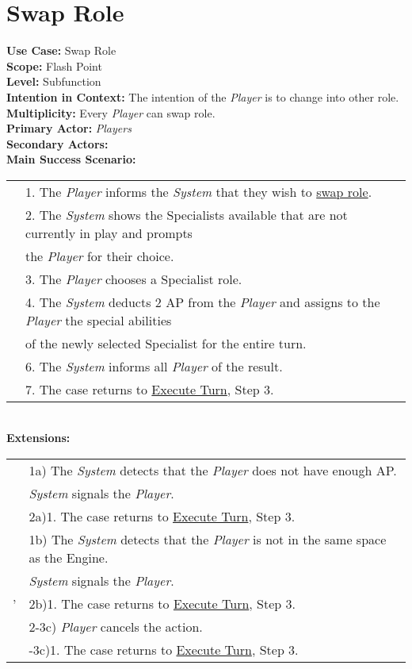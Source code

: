 \documentclass{article}
\begin{document}
	\section*{Swap Role}
	\textbf{Use Case:} Swap Role\\
	\textbf{Scope:} Flash Point\\
	\textbf{Level:} Subfunction\\
	\textbf{Intention in Context:} The intention of the \textit{Player} is to change into other role.\\
	\textbf{Multiplicity: }Every \textit{Player} can swap role.\\
	\textbf{Primary Actor:} \textit{Players}\\
	\textbf{Secondary Actors:}\\
	\textbf{Main Success Scenario:}\\
	\begin{tabular}{l l}
		&1. The \textit{Player} informs the \textit{System} that they wish to \underline{swap role}.\\
		&2. The \textit{System} shows the Specialists available that are not currently in play and prompts\\ &\qquad the \textit{Player} for their choice.\\
		&3. The \textit{Player} chooses a Specialist role.\\
		&4. The \textit{System} deducts 2 AP from the \textit{Player} and assigns to the \textit{Player} the special abilities\\
		&\qquad of the newly selected Specialist for the entire turn.\\
		&6. The \textit{System} informs all \textit{Player} of the result.\\
		&7. The case returns to \underline{Execute Turn}, Step 3.
	\end{tabular}\\
	\textbf{Extensions:}\\
	\begin{tabular}{l l}
		&1a) The \textit{System} detects that the \textit{Player} does not have enough AP.\\ &\qquad\textit{System} signals the \textit{Player}.\\
		&\qquad2a)1. The case returns to \underline{Execute Turn}, Step 3.\\
		&1b) The \textit{System} detects that the \textit{Player} is not in the same space as the Engine.\\
		&\qquad\textit{System} signals the \textit{Player}.\\'
		&\qquad2b)1. The case returns to \underline{Execute Turn}, Step 3.\\
		&2-3c) \textit{Player} cancels the action.\\
		&\qquad2-3c)1. The case returns to \underline{Execute Turn}, Step 3.
	\end{tabular}\\
	
\end{document}
